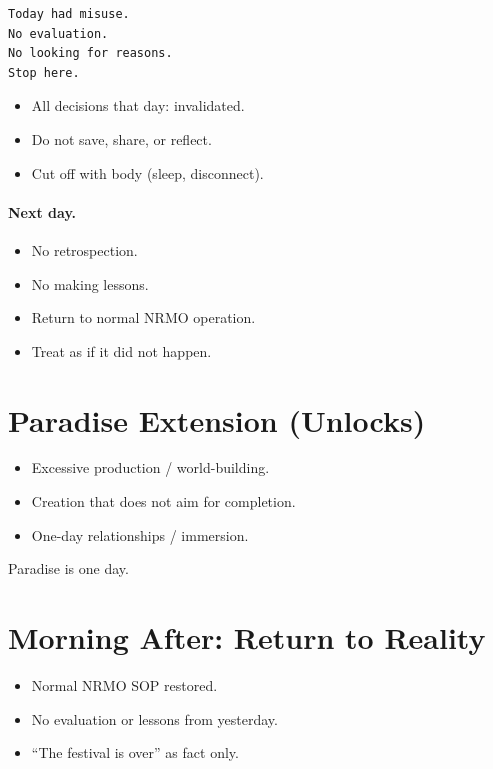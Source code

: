\begin{lstlisting}[basicstyle=\ttfamily\small,frame=single]
Today had misuse.
No evaluation.
No looking for reasons.
Stop here.
\end{lstlisting}

\begin{itemize}
\item All decisions that day: invalidated.
\item Do not save, share, or reflect.
\item Cut off with body (sleep, disconnect).
\end{itemize}

\paragraph{Next day.}
\begin{itemize}
\item No retrospection.
\item No making lessons.
\item Return to normal NRMO operation.
\item Treat as if it did not happen.
\end{itemize}

\section{Paradise Extension (Unlocks)}
\label{sec:hare-paradise}

\begin{itemize}
\item Excessive production / world-building.
\item Creation that does not aim for completion.
\item One-day relationships / immersion.
\end{itemize}

\noindent
Paradise is one day.

\section{Morning After: Return to Reality}
\label{sec:hare-return}

\begin{itemize}
\item Normal NRMO SOP restored.
\item No evaluation or lessons from yesterday.
\item ``The festival is over'' as fact only.
\end{itemize}

